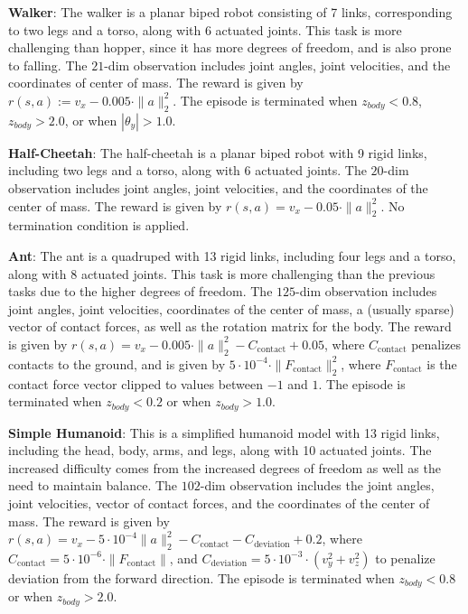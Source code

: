 \documentclass{article}
\newcommand{\norm}[1]{\|#1\|}\clearpage{}
\begin{document}
{\bf Walker}: The walker is a planar biped robot consisting of 7 links, corresponding to two legs and a torso, along with 6 actuated joints. This task is more challenging than hopper, since it has more degrees of freedom, and is also prone to falling. The $21$-dim observation includes joint angles, joint velocities, and the coordinates of center of mass. The reward is given by
$r(s, a) := v_x - 0.005 \cdot \norm{a}_2^2$.
The episode is terminated when $z_{body} < 0.8$, $z_{body} > 2.0$, or when $|\theta_y| > 1.0$.

{\bf Half-Cheetah}: The half-cheetah is a planar biped robot with  9 rigid links, including two legs and a torso, along with 6 actuated joints. The $20$-dim observation includes joint angles, joint velocities, and the coordinates of the center of mass. The reward is given by
$r(s, a) = v_x - 0.05 \cdot \norm{a}_2^2$.
No termination condition is applied.

{\bf Ant}: The ant is a quadruped with 13 rigid links, including four legs and a torso, along with 8 actuated joints. This task is more challenging than the previous tasks due to the higher degrees of freedom. The $125$-dim observation includes joint angles, joint velocities, coordinates of the center of mass, a (usually sparse) vector of contact forces, as well as the rotation matrix for the body. The reward is given by $r(s, a) = v_x - 0.005 \cdot \norm{a}_2^2 - C_{\mathrm{contact}} + 0.05$, where $C_{\mathrm{contact}}$ penalizes contacts to the ground, and is given by
$5\cdot 10^{-4} \cdot \norm{F_{\mathrm{contact}}}_2^2$, where $F_{\mathrm{contact}}$ is the contact force vector clipped to values between $-1$ and $1$. The episode is terminated when $z_{body} < 0.2$ or when $z_{body} > 1.0$.

{\bf Simple Humanoid}: This is a simplified humanoid model with 13 rigid links, including the head, body, arms, and legs, along with 10 actuated joints. The increased difficulty comes from the increased degrees of freedom as well as the need to maintain balance. The $102$-dim observation includes the joint angles, joint velocities, vector of contact forces, and the coordinates of the center of mass. The reward is given by
$r(s, a) = v_x - 5\cdot 10^{-4} \norm{a}_2^2 - C_{\mathrm{contact}} - C_{\mathrm{deviation}} + 0.2$, where $C_{\mathrm{contact}} = 5\cdot 10^{-6} \cdot \norm{F_{\mathrm{contact}}}$, and $C_{\mathrm{deviation}} = 5\cdot 10^{-3} \cdot (v_y^2 + v_z^2)$ to penalize deviation from the forward direction. The episode is terminated when $z_{body} < 0.8$ or when $z_{body} > 2.0$.
\end{document}
